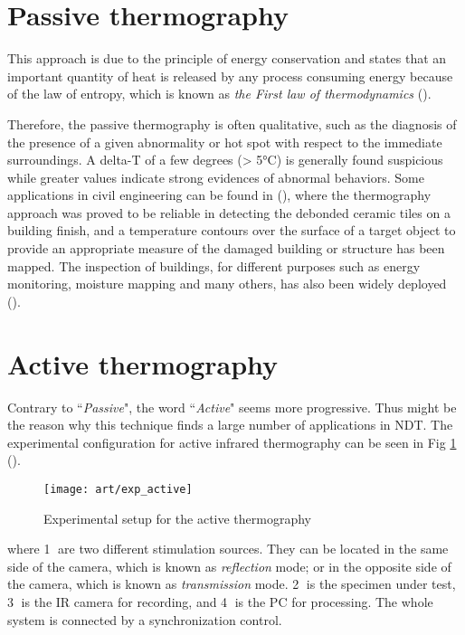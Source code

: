 \section{Passive thermography}
This approach is due to the principle of energy conservation and states that an important quantity of heat is released by any process consuming energy because of the law of entropy, which is known as \textit{the First law of thermodynamics} (\citet{thdy1}). 

Therefore, the passive thermography is often qualitative, such as the diagnosis of the presence of a given abnormality or hot spot with respect to the immediate surroundings.  A delta-T of a few degrees (> 5°C) is generally
found suspicious while greater values indicate strong evidences of abnormal behaviors. Some applications in civil engineering can be found in (\citet{2000-Li,stanley1994non,lo2004building}), where the thermography approach was proved to be reliable in detecting the debonded ceramic tiles on a building finish, and a temperature contours over the surface of a target object to provide an appropriate measure of the damaged building or structure has been mapped. The inspection of buildings, for different purposes such as energy monitoring, moisture mapping and many others, has also been widely deployed (\citet{laranjeirapassive,bison1993automatic,bison2012geometrical}). 

\section{Active thermography}
Contrary to ``\textit{Passive}", the word ``\textit{Active}" seems more progressive. Thus might be the reason why this technique finds a large number of applications in NDT. The experimental configuration for active infrared thermography can be seen in Fig \ref{exp_active} (\citet{sfarra2010comparative}). 
\begin{figure}[!htbp]
	\centering
	\texttt{[image: art/exp\_active]}
	\caption{Experimental setup for the active thermography}
	\label{exp_active}
\end{figure}
where \textcircled{\small 1} are two different stimulation sources. They can be located in the same side of the camera, which is known as \textit{reflection} mode; or in the opposite side of the camera, which is known as \textit{transmission} mode.  \textcircled{\small 2} is the specimen under test, \textcircled{\small 3} is the IR camera for recording, and \textcircled{\small 4} is the PC for processing. The whole system is connected by a synchronization control.

